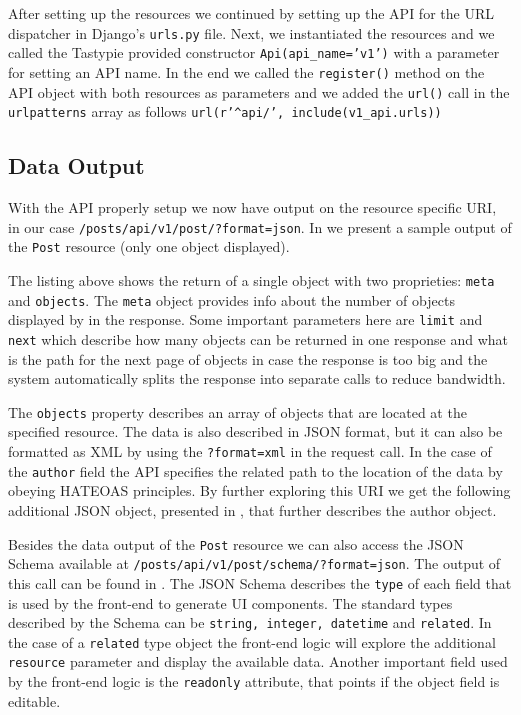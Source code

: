After setting up the resources we continued by setting up the API for the URL dispatcher in Django's \texttt{urls.py} file. Next, we instantiated the resources and we called the Tastypie provided constructor \texttt{Api(api\_name='v1')} with a parameter for setting an API name. In the end we called the \texttt{register()} method on the API object with both resources as parameters and we added the \texttt{url()} call in the \texttt{urlpatterns} array as follows \texttt{url(r'\^{}api/', include(v1\_api.urls))}

\subsection{Data Output}
\label{sub-sec:output}

With the API properly setup we now have output on the resource specific URI, in our case \texttt{/posts/api/v1/post/?format=json}. In  we present a sample output of the \texttt{Post} resource (only one object displayed).

	

The listing above shows the return of a single object with two proprieties: \texttt{meta} and \texttt{objects}. The \texttt{meta} object provides info about the number of objects displayed by in the response. Some important parameters here are \texttt{limit} and \texttt{next} which describe how many objects can be returned in one response and what is the path for the next page of objects in case the response is too big and the system automatically splits the response into separate calls to reduce bandwidth. 

The \texttt{objects} property describes an array of objects that are located at the specified resource. The data is also described in JSON format, but it can also be formatted as XML by using the \texttt{?format=xml} in the request call. In the case of the \texttt{author} field the API specifies the related path to the location of the data by obeying HATEOAS principles. By further exploring this URI we get the following additional JSON object, presented in , that further describes the author object. 





Besides the data output of the \texttt{Post} resource we can also access the JSON Schema available at  \texttt{/posts/api/v1/post/schema/?format=json}. The output of this call can be found in . The JSON Schema describes the \texttt{type} of each field that is used by the front-end to generate UI components. The standard types described by the Schema can be \texttt{string, integer, datetime} and \texttt{related}. In the case of a \texttt{related} type object the front-end logic will explore the additional \texttt{resource} parameter and display the available data. Another important field used by the front-end logic is the \texttt{readonly} attribute, that points if the object field is editable.	

